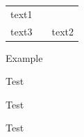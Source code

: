 
\begin{table}[ht]	
	\centering
	\begin{tabular}{|p{9cm}|c|p{7cm}|}
		text1 & \hfill & \\
		text3 & \hfill & text2
	\end{tabular}
\end{table}

\begin{example}
	Example
\end{example}

\begin{newword}
	Test
\end{newword}

\begin{newwords}
	Test
\end{newwords}

\begin{newgraphem}
	Test
\end{newgraphem}